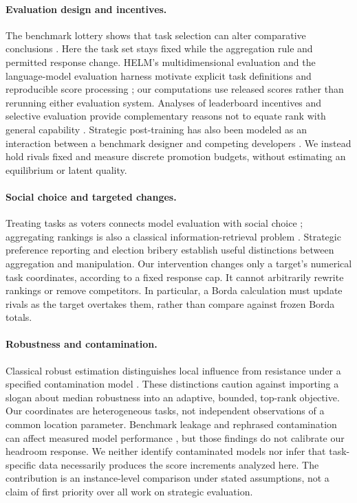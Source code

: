 \documentclass{article}
\begin{document}
\paragraph{Evaluation design and incentives.}
The benchmark lottery shows that task selection can alter comparative conclusions \citep{Dehghani2021Lottery}. Here the task set stays fixed while the aggregation rule and permitted response change. HELM's multidimensional evaluation and the language-model evaluation harness motivate explicit task definitions and reproducible score processing \citep{Liang2022HELM,Gao2023Harness}; our computations use released scores rather than rerunning either evaluation system. Analyses of leaderboard incentives and selective evaluation provide complementary reasons not to equate rank with general capability \citep{Singh2025Illusion}. Strategic post-training has also been modeled as an interaction between a benchmark designer and competing developers \citep{Chen2026Strategic}. We instead hold rivals fixed and measure discrete promotion budgets, without estimating an equilibrium or latent quality.

\paragraph{Social choice and targeted changes.}
Treating tasks as voters connects model evaluation with social choice \citep{Lanctot2023SocialChoice,Brandt2016Handbook}; aggregating rankings is also a classical information-retrieval problem \citep{Dwork2001Rank}. Strategic preference reporting \citep{Gibbard1973Manipulation} and election bribery \citep{Faliszewski2009Bribery} establish useful distinctions between aggregation and manipulation. Our intervention changes only a target's numerical task coordinates, according to a fixed response cap. It cannot arbitrarily rewrite rankings or remove competitors. In particular, a Borda calculation must update rivals as the target overtakes them, rather than compare against frozen Borda totals.

\paragraph{Robustness and contamination.}
Classical robust estimation distinguishes local influence from resistance under a specified contamination model \citep{Huber1964Robust,Hampel1974Influence,Rousseeuw1984Median}. These distinctions caution against importing a slogan about median robustness into an adaptive, bounded, top-rank objective. Our coordinates are heterogeneous tasks, not independent observations of a common location parameter. Benchmark leakage and rephrased contamination can affect measured model performance \citep{Zhou2023Cheater,Yang2023Rephrased}, but those findings do not calibrate our headroom response. We neither identify contaminated models nor infer that task-specific data necessarily produces the score increments analyzed here. The contribution is an instance-level comparison under stated assumptions, not a claim of first priority over all work on strategic evaluation.
\end{document}
